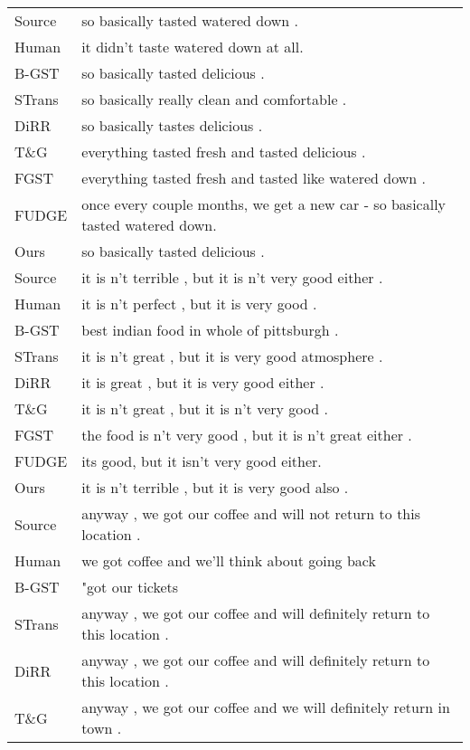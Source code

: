 \documentclass[11pt]{article}
\begin{document}
\begin{table}[ht]
    \centering
    \footnotesize
    \vspace{-10pt}
    \begin{tabular}{lp{13cm}}
\toprule
Source&so basically tasted watered down .\\
Human&it didn't taste watered down at all.\\
\midrule
B-GST&so basically tasted delicious .\\
STrans&so basically really clean and comfortable .\\
DiRR&so basically tastes delicious .\\
T\&G&everything tasted fresh and tasted delicious .\\
FGST&everything tasted fresh and tasted like watered down .\\
\midrule
FUDGE&once every couple months, we get a new car - so basically tasted watered down.\\
Ours&so basically tasted delicious .\\
\midrule[1pt]
Source&it is n't terrible , but it is n't very good either .\\
Human&it is n't perfect , but it is very good .\\
\midrule
B-GST&best indian food in whole of pittsburgh .\\
STrans&it is n't great , but it is very good atmosphere .\\
DiRR&it is great , but it is very good either .\\
T\&G&it is n't great , but it is n't very good .\\
FGST&the food is n't very good , but it is n't great either .\\
\midrule
FUDGE&its good, but it isn't very good either.\\
Ours&it is n't terrible , but it is very good also .\\
\midrule[1pt]
Source&anyway , we got our coffee and will not return to this location .\\
Human&we got coffee and we'll think about going back\\
\midrule
B-GST&"got our tickets\\
STrans&anyway , we got our coffee and will definitely return to this location .\\
DiRR&anyway , we got our coffee and will definitely return to this location .\\
T\&G&anyway , we got our coffee and we will definitely return in town .\\

\end{tabular}
\end{table}
\end{document}
